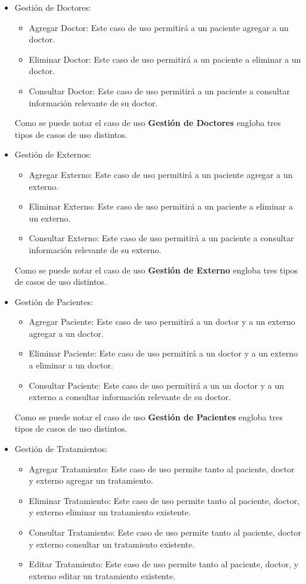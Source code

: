 \begin{itemize}
	
	\item Gestión de Doctores:
		\begin{itemize}
			\item Agregar Doctor: Este caso de uso permitirá a un paciente agregar a un doctor.
			\item Eliminar Doctor: Este caso de uso permitirá a un paciente a eliminar a un doctor.
			\item Consultar Doctor: Este caso de uso permitirá a un paciente a consultar información relevante de su doctor.
		\end{itemize}
	Como se puede notar el caso de uso \textbf{Gestión de Doctores} engloba tres tipos de casos de uso distintos.
	
	\item Gestión de Externos:
	\begin{itemize}
		\item Agregar Externo: Este caso de uso permitirá a un paciente agregar a un externo.
		\item Eliminar Externo: Este caso de uso permitirá a un paciente a eliminar a un externo.
		\item Consultar Externo: Este caso de uso permitirá a un paciente a consultar información relevante de su externo.
	\end{itemize}
	Como se puede notar el caso de uso \textbf{Gestión de Externo} engloba tres tipos de casos de uso distintos.
	
	\item Gestión de Pacientes:
	\begin{itemize}
		\item Agregar Paciente: Este caso de uso permitirá a un doctor y a un externo agregar a un doctor.
		\item Eliminar Paciente: Este caso de uso permitirá a un doctor y a un externo a eliminar a un doctor.
		\item Consultar Paciente: Este caso de uso permitirá a un un doctor y a un externo a consultar información relevante de su doctor.
	\end{itemize}
	Como se puede notar el caso de uso \textbf{Gestión de Pacientes} engloba tres tipos de casos de uso distintos.
	
	\item Gestión de Tratamientos: 
	\begin{itemize}
		\item Agregar Tratamiento: Este caso de uso permite tanto al paciente, doctor y externo agregar un tratamiento.
		\item Eliminar Tratamiento: Este caso de uso permite tanto al paciente, doctor, y externo eliminar un tratamiento existente.
		\item Consultar Tratamiento: Este caso de uso permite tanto al paciente, doctor y externo consultar un tratamiento existente.
		\item Editar Tratamiento: Este caso de uso permite tanto al paciente, doctor, y externo editar un tratamiento existente.
	\end{itemize}
	

\end{itemize}
